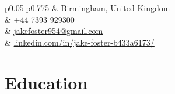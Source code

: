 \documentclass[11pt]{article} %
\begin{document}
\begin{paracol}{2}

\pagebreak %
\switchcolumn %


\parbox[top][0.12\textheight][c]{\linewidth}{ %
	\vspace{-0.04\textheight} %
	\colorbox{shade}{ %
		\begin{supertabular}{p{0.05\linewidth}|p{0.775\linewidth}} %
			\raisebox{-1pt}{\faHome} & Birmingham, United Kingdom \\ %
			\raisebox{-1pt}{\faPhone} & +44 7393 929300 \\ %
			\raisebox{0pt}{\small\faEnvelope} & \href{mailto:jakefoster954@gmail.com}{jakefoster954@gmail.com} \\ %
			\raisebox{-1pt}{\small\faLinkedin} & \href{https://linkedin.com/in/jake-foster-b433a6173/}{linkedin.com/in/jake-foster-b433a6173/} \\ %
		\end{supertabular}
	}
}


\section{Education} 


\end{paracol}
\end{document}
